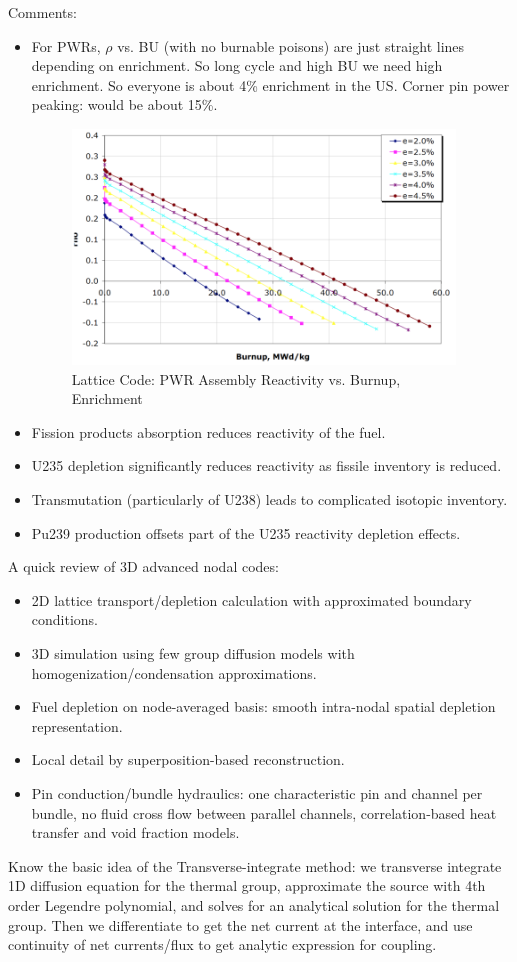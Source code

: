 \documentclass{school-22.211-notes}
\begin{document}
Comments: 
\begin{itemize}
\item For PWRs, $\rho$ vs. BU (with no burnable poisons) are just straight lines depending on enrichment. So long cycle and high BU we need high enrichment. So everyone is about 4\% enrichment in the US.  Corner pin power peaking: would be about 15\%. 
\begin{figure}[ht]
  \centering
  \includegraphics[width=4in]{images/design/lattice-rho-vs-BU.png}
  \caption{Lattice Code: PWR Assembly Reactivity vs. Burnup, Enrichment} \label{lattice-rho-vs-BU}
\end{figure}
\item Fission products absorption reduces reactivity of the fuel. 
\item U235 depletion significantly reduces reactivity as fissile inventory is reduced. 
\item Transmutation (particularly of U238) leads to complicated isotopic inventory. 
\item Pu239 production offsets part of the U235 reactivity depletion effects. 
\end{itemize}


A quick review of 3D advanced nodal codes: 
\begin{itemize}
\item 2D lattice transport/depletion calculation with approximated boundary conditions. 
\item 3D simulation using few group diffusion models with homogenization/condensation approximations. 
\item Fuel depletion on node-averaged basis: smooth intra-nodal spatial depletion representation. 
\item Local detail by superposition-based reconstruction. 
\item Pin conduction/bundle hydraulics: one characteristic pin and channel per bundle, no fluid cross flow between parallel channels, correlation-based heat transfer and void fraction models. 
\end{itemize}
Know the basic idea of the Transverse-integrate method: we transverse integrate 1D diffusion equation for the thermal group, approximate the source with 4th order Legendre polynomial, and solves for an analytical solution for the thermal group. Then we differentiate to get the net current at the interface, and use continuity of net currents/flux to get analytic expression for coupling. 
\end{document}
